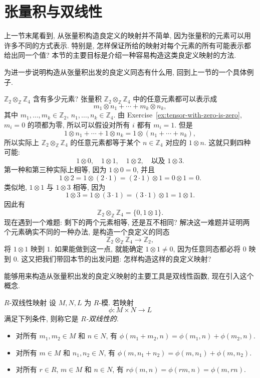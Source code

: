 \section{张量积与双线性}\label{sec:tensor-products-and-bilinearity}

上一节末尾看到, 从张量积构造良定义的映射并不简单, 因为张量积的元素可以用许多不同的方式表示. 特别是, 怎样保证所给的映射对每个元素的所有可能表示都给出同一个值? 本节的主要目标是介绍一种容易构造这类良定义映射的方法.

为进一步说明构造从张量积出发的良定义同态有什么用, 回到上一节的一个具体例子.

\begin{Example}{$\mathbb{Z}_{2}\otimes_{\mathbb{Z}}\mathbb{Z}_{4}$ 含有多少元素?}\leavevmode\label{ex:cyclic-tensor-product-z2-z4}
张量积 $\mathbb{Z}_{2}\otimes_{\mathbb{Z}}\mathbb{Z}_{4}$ 中的任意元素都可以表示成
\[
  m_{1}\otimes n_{1}+\cdots+m_{k}\otimes n_{k},
\]
其中 $m_{1},\ldots,m_{k}\in\mathbb{Z}_{2}$, $n_{1},\ldots,n_{k}\in\mathbb{Z}_{4}$. 由 Exercise~\ref{ex:tensor-with-zero-is-zero}, $m_{i}=0$ 的项都为零, 所以可以假设对所有 $i$ 都有 $m_{i}=1$. 但是
\[
  1\otimes n_{1}+\cdots+1\otimes n_{k}=1\otimes(n_{1}+\cdots+n_{k}),
\]
所以实际上 $\mathbb{Z}_{2}\otimes_{\mathbb{Z}}\mathbb{Z}_{4}$ 的任意元素都等于某个 $n\in\mathbb{Z}_{4}$ 对应的 $1\otimes n$. 这就只剩四种可能:
\[
  1\otimes0,\quad1\otimes1,\quad1\otimes2,\quad\text{以及 }1\otimes3.
\]
第一种和第三种实际上相等, 因为 $1\otimes0=0$, 并且
\[
  1\otimes2=1\otimes(2\cdot1)=(2\cdot1)\otimes1=0\otimes1=0.
\]
类似地, $1\otimes1$ 与 $1\otimes3$ 相等, 因为
\[
  1\otimes3=1\otimes(3\cdot1)=(3\cdot1)\otimes1=1\otimes1.
\]
因此有
\[
  \mathbb{Z}_{2}\otimes_{\mathbb{Z}}\mathbb{Z}_{4}=\{0,1\otimes1\}.
\]
现在遇到一个难题: 剩下的两个元素相等, 还是互不相同? 解决这一难题并证明两个元素确实不同的一种办法, 是构造一个良定义的同态
\[
  \mathbb{Z}_{2}\otimes_{\mathbb{Z}}\mathbb{Z}_{4}\to\mathbb{Z}_{2},
\]
将 $1\otimes1$ 映到 $1$. 如果能做到这一点, 就能确定 $1\otimes1\neq0$, 因为任意同态都必将 $0$ 映到 $0$. 这又把我们带回本节的出发问题: 怎样构造这样的良定义映射?
\end{Example}

能够用来构造从张量积出发的良定义映射的主要工具是双线性函数, 现在引入这个概念.

\begin{Definition}{$R$-双线性映射}\leavevmode\label{def:r-bilinear-map}
设 $M,N,L$ 为 $R$-模. 若映射
\[
  \phi:M\times N\to L
\]
满足下列条件, 则称它是 \emph{$R$-双线性的}.
\begin{itemize}
  \item 对所有 $m_{1},m_{2}\in M$ 和 $n\in N$, 有 $\phi(m_{1}+m_{2},n)=\phi(m_{1},n)+\phi(m_{2},n)$.
  \item 对所有 $m\in M$ 和 $n_{1},n_{2}\in N$, 有 $\phi(m,n_{1}+n_{2})=\phi(m,n_{1})+\phi(m,n_{2})$.
  \item 对所有 $r\in R$, $m\in M$ 和 $n\in N$, 有 $r\phi(m,n)=\phi(rm,n)=\phi(m,rn)$.
\end{itemize}
\end{Definition}

